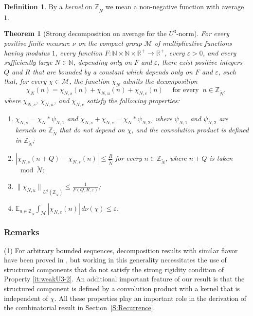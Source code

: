 \documentclass[11pt]{amsart}
\newtheorem{theorem}[lemma]{Theorem}
\theoremstyle{definition}
\newtheorem*{definition}{Definition}
\begin{document}
\begin{definition}
By a \emph{kernel} on ${{{\mathbb Z}}_{\widetilde N}}$ we mean a non-negative function with
average $1$.
\end{definition}

\begin{theorem}[Strong decomposition on average for the $U^3$-norm]
\label{th:strong-average-intro} For every positive finite measure
$\nu$ on the compact group ${{\mathcal M}}$ of multiplicative functions having
modulus $1$,
 every function $F\colon{{\mathbb N}} \times{{\mathbb N}} \times
{{\mathbb R}}^+\to{{\mathbb R}}^+$,  every ${\varepsilon} >0$,  and
every
sufficiently large  $N\in {{\mathbb N}}$, depending only on  $F$ and ${\varepsilon}$,
 there exist positive integers
  $Q$ and  $R$ that are  bounded by a constant which depends only on $F$ and
  ${\varepsilon}$,
  such that, for  every $\chi\in{{\mathcal M}}$, the function $\chi_N$ admits the
 decomposition
$$
\chi_N(n)=\chi_{N,s}(n)+\chi_{N,u}(n)+\chi_{N,e}(n) \quad \text{ for
every }\  n\in{{{\mathbb Z}}_{\widetilde N}},
$$
where  $\chi_{N,s}$, $\chi_{N,u}$, and
   $\chi_{N,e}$ satisfy the following properties:
\begin{enumerate}
\item
\label{it:decomU31}
{\rule{0mm}{5mm}} $\chi_{N,s}=\chi_N*\psi_{N,1}$ and  $\chi_{N,s}+\chi_{N,e}=\chi_N*\psi_{N,2}$,
where  $\psi_{N,1}$ and $\psi_{N,2}$ are kernels on ${{\mathbb Z}}_{{\widetilde N}}$ that do not depend on $\chi$, and
  the convolution product is  defined in ${{{\mathbb Z}}_{\widetilde N}}$;

\item\label{it:decompU32}
{\rule{0mm}{5mm}} $\displaystyle |\chi_{N,s}(n+Q)-\chi_{N,s}(n)|\leq \frac R{{\widetilde N}}$
for every $n\in{{{\mathbb Z}}_{\widetilde N}}$,  where  $n+Q$ is taken $\!\!\! \mod {{\widetilde N}}$;
\item
\label{it:decomU33}
{\rule{0mm}{5mm}} $\displaystyle {\lVert {\chi_{N,u}} \rVert}_{U^3({{{\mathbb Z}}_{\widetilde N}})}\leq\frac 1{F(Q, R,{\varepsilon})}$;
\item
\label{it:decomU34}
{\rule{0mm}{5mm}} $ {{\mathbb E}}_{n\in {{{\mathbb Z}}_{\widetilde N}}} \int_{{\mathcal M}} |\chi_{N,e}(n)|\,d\nu(\chi)\leq{\varepsilon}$.
\end{enumerate}
\end{theorem}
\subsubsection*{Remarks}
(1) For arbitrary bounded sequences, decomposition results with
similar flavor have been proved in \cite{G10, GW11, GT10,
  Sz12, T06}, but working in this generality necessitates the
use of structured components that  do  not  satisfy the strong
rigidity condition of  Property \eqref{it:weakU3-2}.
 An additional important feature of our result
  is  that the structured component  is defined by a
convolution product with a kernel that is independent of $\chi$. All
these properties
play an important role in the derivation of the combinatorial result in
Section~\ref{S:Recurrence}.
\end{document}
